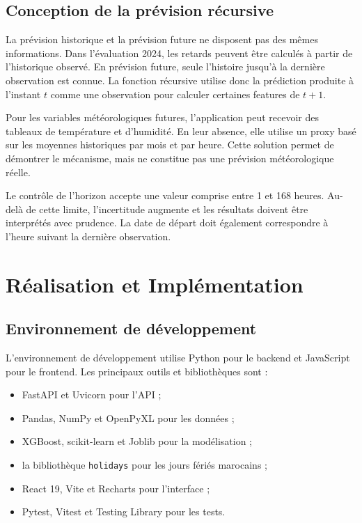 \documentclass[12pt,a4paper]{report}
\begin{document}
\section{Conception de la prévision récursive}

La prévision historique et la prévision future ne disposent pas des mêmes
informations. Dans l’évaluation 2024, les retards peuvent être calculés à
partir de l’historique observé. En prévision future, seule l’histoire jusqu’à
la dernière observation est connue. La fonction récursive utilise donc la
prédiction produite à l’instant $t$ comme une observation pour calculer
certaines features de $t+1$.

Pour les variables météorologiques futures, l’application peut recevoir des
tableaux de température et d’humidité. En leur absence, elle utilise un proxy
basé sur les moyennes historiques par mois et par heure. Cette solution
permet de démontrer le mécanisme, mais ne constitue pas une prévision
météorologique réelle.

Le contrôle de l’horizon accepte une valeur comprise entre 1 et 168 heures.
Au-delà de cette limite, l’incertitude augmente et les résultats doivent être
interprétés avec prudence. La date de départ doit également correspondre à
l’heure suivant la dernière observation.

\chapter{Réalisation et Implémentation}

\section{Environnement de développement}

L'environnement de développement utilise Python pour le backend et JavaScript
pour le frontend. Les principaux outils et bibliothèques sont :

\begin{itemize}
	\item FastAPI et Uvicorn pour l'API ;
	\item Pandas, NumPy et OpenPyXL pour les données ;
	\item XGBoost, scikit-learn et Joblib pour la modélisation ;
	\item la bibliothèque \texttt{holidays} pour les jours fériés marocains ;
	\item React 19, Vite et Recharts pour l'interface ;
	\item Pytest, Vitest et Testing Library pour les tests.
\end{itemize}
\end{document}

